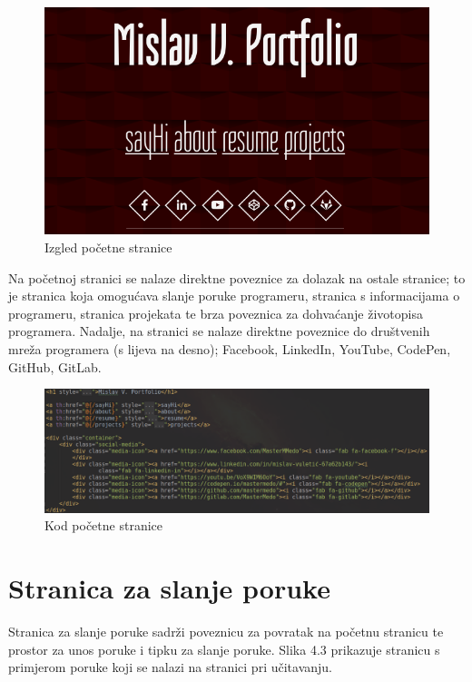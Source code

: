 \documentclass[times, utf8, zavrsni, numeric]{fer}
\begin{document}
\begin{figure}[htb]
				\centering
				\includegraphics[width=14.6cm]{images/front-page.png}
				\caption{Izgled početne stranice}
				\label{fig:front-page}
\end{figure}

Na početnoj stranici se nalaze direktne poveznice za dolazak na ostale stranice; to je stranica koja omogućava slanje poruke programeru, stranica s informacijama o programeru, stranica projekata te brza poveznica za dohvaćanje životopisa programera.
Nadalje, na stranici se nalaze direktne poveznice do društvenih mreža programera (s lijeva na desno); Facebook, LinkedIn, YouTube, CodePen, GitHub, GitLab.

\begin{figure}[htb]
				\centering
				\includegraphics[width=14.6cm]{images/start-page.png}
				\caption{Kod početne stranice}
				\label{fig:start-page}
\end{figure}

\section{Stranica za slanje poruke}
\qquad Stranica za slanje poruke sadrži poveznicu za povratak na početnu stranicu te prostor za unos poruke i tipku za slanje poruke. Slika 4.3 prikazuje stranicu s primjerom poruke koji se nalazi na stranici pri učitavanju.
\end{document}
